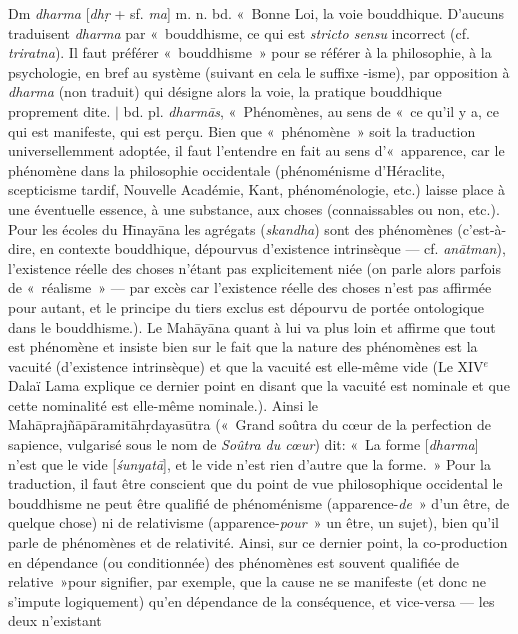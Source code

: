 \documentclass[a4paper,11pt,twocolumn]{article}
\begin{document}
{\dn Dm\0} {\em dharma} [{\em dh\d{r}} + sf. {\em ma}]
m. n. bd. «~Bonne Loi\fg, la voie bouddhique. D'aucuns traduisent {\em
dharma\/} par «~bouddhisme\fg, ce qui est {\em stricto sensu} incorrect
(cf. {\em triratna}). Il faut préférer «~bouddhisme~» pour se référer
à la philosophie, à la
psychologie, en bref au système (suivant en cela le suffixe -isme),
par opposition à {\em dharma} (non traduit) qui désigne alors la voie, la
pratique bouddhique proprement dite. $\mid$ bd. pl. {\em dharm\={a}s},
«~Phénomènes\fg, au sens de «~ce qu'il y a, ce qui est manifeste, qui est
per\c{c}u\fg. Bien que «~phénomène~» soit la traduction
universellemment adoptée, il faut l'entendre en fait au sens
d'«~apparence\fg, car le phénomène dans la philosophie occidentale
(phénoménisme d'Héraclite, scepticisme tardif, Nouvelle Académie,
Kant, phénoménologie, etc.)
laisse place à une éventuelle essence, à une substance, aux choses
(connaissables ou non, etc.). Pour les écoles du
H\={\i}nay\={a}na les agrégats ({\em skandha}) sont des phénomènes
(c'est-à-dire, en contexte bouddhique, dépourvus d'existence
intrinsèque --- cf. {\em an\={a}tman}), l'existence réelle des choses
n'étant pas explicitement niée (on parle alors parfois de
«~réalisme~» --- par excès car l'existence réelle des choses n'est
pas affirmée pour autant, et le principe du tiers exclus est dépourvu
de portée ontologique dans le bouddhisme.). Le Mah\={a}y\={a}na quant à
lui va plus loin et affirme que tout est phénomène et insiste
bien sur le fait que la nature des phénomènes est la vacuité
(d'existence intrinsèque) et que la vacuité est elle-même vide (Le
XIV$^e$ Dalaï Lama explique ce dernier point en disant que la vacuité
est nominale et que cette nominalité est elle-même nominale.). Ainsi
le Mah\={a}prajñ\={a}p\={a}ramit\={a}h\d{r}dayas\={u}tra («~Grand
soûtra du c{\oe}ur de la perfection de sapience\fg, vulgarisé sous le nom de
{\em Soûtra du c{\oe}ur}) dit: «~La forme [{\em dharma}] n'est que
le vide [{\em \'{s}unyat\={a}}], et le vide n'est rien d'autre que
la forme.~» Pour la traduction, il faut être conscient que du point
de vue philosophique occidental le bouddhisme ne peut être qualifié de
phénoménisme (\og apparence-{\em de}~» d'un être, de quelque chose)
ni de relativisme (\og apparence-{\em pour}~» un être, un sujet),
bien qu'il parle de phénomènes et de relativité. Ainsi, sur ce dernier
point, la co-production en dépendance (ou conditionnée) des phénomènes
est souvent qualifiée de \og relative~»pour signifier, par exemple,
que la cause ne se manifeste (et donc ne s'impute logiquement) qu'en
dépendance de la conséquence, et vice-versa --- les deux n'existant
\end{document}
